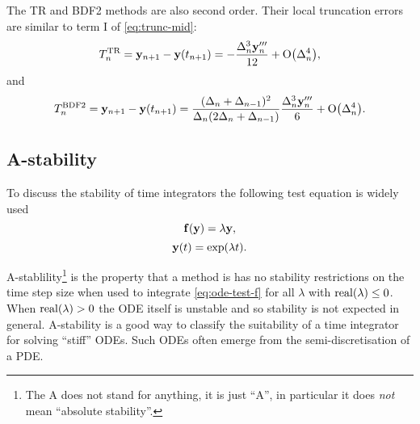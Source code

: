The TR \cite[261]{GreshoSani} and BDF2 \cite[715]{GreshoSani} methods are also second order.
Their local truncation errors are similar to term I of \cref{eq:trunc-mid}:
\begin{equation}
  \label{eq:tr-lte}
  T_n^{\text{TR}} = \mathbf{y}_{n+1} - \mathbf{y}(t_{n+1}) = -\frac{\Delta_{n}^3 \mathbf{y}_n'''}{12}
  + \text{O}{\left( \Delta_{n}^4 \right)},
\end{equation}
and
\begin{equation}
  \label{eq:bdf2-lte}
  T_n^{\text{BDF2}} = \mathbf{y}_{n+1} - \mathbf{y}(t_{n+1}) = \frac{(\Delta_{n} + \Delta_{n-1})^2}{\Delta_{n}(2\Delta_{n} + \Delta_{n-1})}
  \frac{\Delta_{n}^3 \mathbf{y}_n'''}{6}
  + \text{O}{\left( \Delta_{n}^4 \right)}.
\end{equation}


\subsection{A-stability}
\label{sec:A-stability}

To discuss the stability of time integrators the following test equation is widely used
\begin{equation}
  {\mathbf{f}{\left( \mathbf{y}\right)}} = \lambda \mathbf{y},
  \label{eq:ode-test-f}
\end{equation}
\ie
\begin{equation}
  \mathbf{y}(t) = \exp(\lambda t).
\end{equation}

A-stablility\footnote{The A does not stand for anything, it is just ``A''\cite[40]{HairerWanner}, in particular it does \emph{not} mean ``absolute stability''.} is the property that a method is has no stability restrictions on the time step size when used to integrate \cref{eq:ode-test-f} for all $\lambda$ with $\operatorname{real}(\lambda) \leq 0$.
When $\operatorname{real}(\lambda) > 0$ the ODE itself is unstable and so stability is not expected in general.
A-stability is a good way to classify the suitability of a time integrator for solving ``stiff'' ODEs.
Such ODEs often emerge from the semi-discretisation of a PDE.

